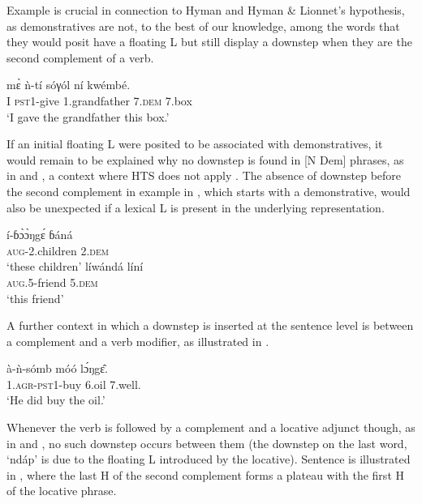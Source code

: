 \documentclass[output=paper,newtxmath,modfonts,nonflat]{langsci/langscibook}
\begin{document}
\noindent Example  is crucial in connection to Hyman and Hyman \& Lionnet's hypothesis, as demonstratives are not, to the best of our knowledge, among the words that they would posit have a floating L  but still display a downstep when they are the second complement of a verb.


\ea \gll  m\`ɛ ǹ-tí sóγól ní {\textdownstep}kwémbé.\\
I \textsc{pst1}-give 1.grandfather 7.\textsc{dem} 7.box\\
\glt `I gave the grandfather this box.'\label{ex:HamlaouiMakasso:12}
\z

\noindent If an initial floating L  were posited to be associated with demonstratives, it would remain to be explained why no downstep is found in [N Dem] phrases, as in  and  \citep[273]{Hyman03}, a context where HTS does not apply \citep[28]{HamlaouiEtAl14}. The absence of downstep before the second complement in example  in , which starts with a demonstrative, would also be unexpected if a lexical L  is present in the underlying representation.

\ea \label{ex:HamlaouiMakasso:13}
 \gll í-ɓ\`ɔ\`ɔŋg\'ɛ ɓ{á}n{á}\\
\textsc{aug}-2.children 2.\textsc{dem}\\
\glt `these children'
\ex \gll lí{\textdownstep}w{á}nd{á} líní\\
\textsc{aug}.5-friend 5.\textsc{dem}\\
\glt `this friend'\label{ex:HamlaouiMakasso:13b}
\z

A further context in which a downstep is inserted at the sentence level is between a complement and a verb modifier, as illustrated in .

\ea \gll à-ǹ-sómb móó {\textdownstep}l\'ɔŋg\^ɛ.\\
1.\textsc{agr}-\textsc{pst1}-buy 6.oil 7.well.\\
\glt `He did buy the oil.'\label{ex:HamlaouiMakasso:14}
\z

Whenever the verb is followed by a complement and a locative adjunct though, as in  and , no such downstep occurs between them (the downstep on the last word, `nd{á}p' is due to the floating L introduced by the locative). Sentence  is illustrated in , where the last H  of the second complement forms a plateau with the first H  of the locative phrase.
\end{document}
